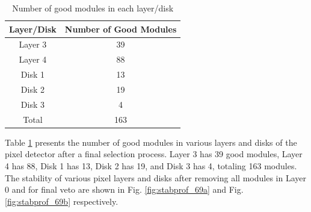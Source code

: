 \begin{table}
\centering
\caption{Number of good modules in each layer/disk}
\label{tab:2022ldmodules}
\begin{tabular}{cc}
\textbf{Layer/Disk} & \textbf{Number of Good Modules} \\
\hline
Layer 3 & 39 \\
Layer 4 & 88 \\
Disk 1 & 13 \\
Disk 2 &  19\\
Disk 3 &  4\\
Total & 163\\
\end{tabular}
\end{table}

Table \ref{tab:2022ldmodules} presents the number of good modules in various layers and disks of the pixel detector after a final selection process. Layer 3 has 39 good modules, Layer 4 has 88, Disk 1 has 13, Disk 2 has 19, and Disk 3 has 4, totaling 163 modules. The stability of various pixel layers and disks after removing all modules in Layer 0 and for final veto are shown in Fig. \ref{fig:stabprof_69a}  and Fig. \ref{fig:stabprof_69b} respectively.

